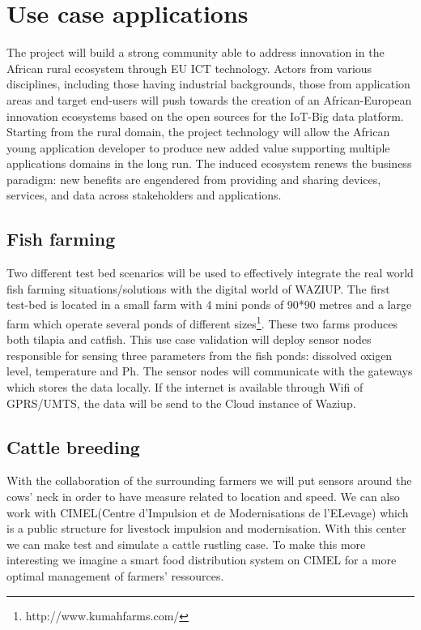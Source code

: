 
\section{Use case applications}

The project will build a strong community able to address innovation in the African rural ecosystem through EU ICT technology.
Actors from various disciplines, including those having industrial backgrounds, those from application areas and target end-users will push towards the creation of an African-European innovation ecosystems based on the open sources for the IoT-Big data platform.
Starting from the rural domain, the project technology will allow the
African young application developer to produce new added value supporting multiple applications domains in the long run.
The induced ecosystem renews the business paradigm: new benefits are engendered from providing and sharing devices, services, and data across stakeholders and applications.

\subsection{Fish farming}

Two different test bed scenarios will be used to effectively integrate the real world fish farming situations/solutions with the digital world of WAZIUP.
The first test-bed is located in a small farm with 4 mini ponds of 90*90 metres and a large farm which operate several ponds of different sizes\footnote{http://www.kumahfarms.com/}.
These two farms produces both tilapia and catfish.
This use case validation will deploy sensor nodes responsible for sensing three parameters from the fish ponds: dissolved oxigen level, temperature and Ph.
The sensor nodes will communicate with the gateways which stores the data locally.
If the internet is available through Wifi of GPRS/UMTS, the data will be send to the Cloud instance of Waziup.

\subsection{Cattle breeding}

With the collaboration of the surrounding farmers we will put sensors around the cows’ neck in order to have measure related to location and speed.
We can also work with CIMEL(Centre d’Impulsion et de Modernisations de l’ELevage) which is a public structure for livestock impulsion and modernisation.
With this center we can make test and simulate a cattle rustling case.
To make this more interesting we imagine a smart food distribution system on CIMEL for a more optimal management of farmers’ ressources.

